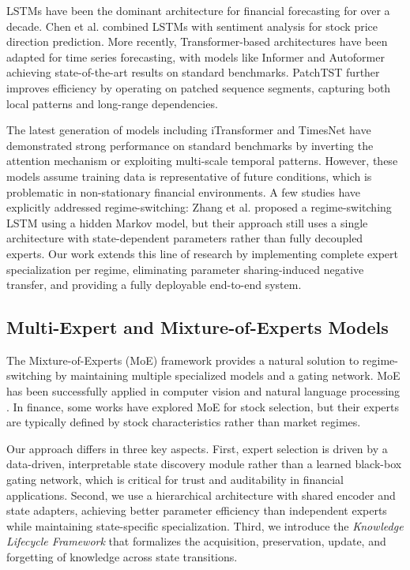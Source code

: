 \documentclass[review]{elsarticle}
\begin{document}
LSTMs \citep{hochreiter1997long} have been the dominant architecture for financial forecasting for over a decade. Chen et al. \citep{chen2015lstm} combined LSTMs with sentiment analysis for stock price direction prediction. More recently, Transformer-based architectures \citep{vaswani2017attention} have been adapted for time series forecasting, with models like Informer \citep{zhou2021informer} and Autoformer \citep{wu2021autoformer} achieving state-of-the-art results on standard benchmarks. PatchTST \citep{nie2023patchtst} further improves efficiency by operating on patched sequence segments, capturing both local patterns and long-range dependencies.

The latest generation of models including iTransformer \citep{liu2024itransformer} and TimesNet \citep{wu2023timesnet} have demonstrated strong performance on standard benchmarks by inverting the attention mechanism or exploiting multi-scale temporal patterns. However, these models assume training data is representative of future conditions, which is problematic in non-stationary financial environments. A few studies have explicitly addressed regime-switching: Zhang et al. \citep{zhang2020stock} proposed a regime-switching LSTM using a hidden Markov model, but their approach still uses a single architecture with state-dependent parameters rather than fully decoupled experts. Our work extends this line of research by implementing complete expert specialization per regime, eliminating parameter sharing-induced negative transfer, and providing a fully deployable end-to-end system.

\subsection{Multi-Expert and Mixture-of-Experts Models}

The Mixture-of-Experts (MoE) framework \citep{jacobs1991adaptive} provides a natural solution to regime-switching by maintaining multiple specialized models and a gating network. MoE has been successfully applied in computer vision \citep{shazeer2017outrageously} and natural language processing \citep{lepikhin2021gshard}. In finance, some works have explored MoE for stock selection, but their experts are typically defined by stock characteristics rather than market regimes.

Our approach differs in three key aspects. First, expert selection is driven by a data-driven, interpretable state discovery module rather than a learned black-box gating network, which is critical for trust and auditability in financial applications. Second, we use a hierarchical architecture with shared encoder and state adapters, achieving better parameter efficiency than independent experts while maintaining state-specific specialization. Third, we introduce the \textit{Knowledge Lifecycle Framework} that formalizes the acquisition, preservation, update, and forgetting of knowledge across state transitions.
\end{document}
